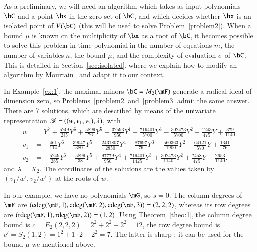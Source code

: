 As a preliminary, we will need an algorithm which takes as input polynomials
$\bC$ and a point $\bx$ in the zero-set of $\bC$, and which decides whether
$\bx$ is an isolated point of $V(\bC)$ (this will be used to solve
Problem~\eqref{problem2}). When a bound $\mu$ is known on the multiplicity of
$\bx$ as a root of $\bC$, it becomes possible to solve this problem in time
polynomial in the number of equations $m$, the number of variables $n$, the
bound $\mu$, and the complexity of evaluation $\sigma$ of $\bC$. This is
detailed in Section~\ref{sec:isolated}, where we explain how to modify an
algorithm by Mourrain~\cite{Mourrain97} and adapt it to our context.

\begin{example}\label{ex:2}
  In Example~\ref{ex:1}, the maximal minors $\bC = M_2(\mF)$ generate a radical
  ideal of dimension zero, so Problems~\ref{problem2} and~\ref{problem3} admit the same
  answer. There are 7 solutions, which are described by means of the univariate
  representation $\mathscr{R}=((w,v_1,v_2),\lambda)$, with 
{\small  \begin{align*}
w &= Y^7 + \frac{5249}{285}Y^6 + \frac{5899}{76}Y^5 - \frac{32593}{950}Y^4 - \frac{719401}{5700}Y^3 
        - \frac{302473}{5700}Y^2 - \frac{1243}{475}Y + \frac{379}{1140}\\[1mm]
v_1&= -\frac{461}{114}Y^6 - \frac{39047}{380}Y^5 - \frac{2431807}{2850}Y^4 - \frac{87697}{76}Y^3 - \frac{560363}{1900}Y^2 
      + \frac{64121}{570}Y + \frac{1341}{76}\\[1mm]
v_2 &= -\frac{5249}{285}Y^6 - \frac{5899}{38}Y^5 + \frac{97779}{950}Y^4 + \frac{719401}{1425}Y^3 
       + \frac{302473}{1140}Y^2 + \frac{7458}{475}Y - \frac{2653}{1140}.
         \end{align*}}
       and $\lambda = X_2$. The coordinates of the solutions are the values taken by $(v_1/w',v_2/w')$
       at the roots of $w$.

    In our example, we have no polynomials $\mG$, so $s=0$. The column degrees of
  $\mF$ are $(\cdeg(\mF,1),\cdeg(\mF,2),\cdeg(\mF,3))=(2,2,2)$, whereas its
  row degrees are $(\rdeg(\mF,1),\rdeg(\mF,2))=(1,2)$. 
  Using Theorem~\ref{theo:1}, the column degree bound is $c=E_2(2,2,2) = 2^2 + 2^2 +
  2^2 =12$, the row degree bound is $c'=S_2(1,2) = 1^2 + 1\cdot 2 +
  2^2 = 7$. The latter is sharp ; it can be used for the bound $\mu$ we
  mentioned above.
\end{example}


